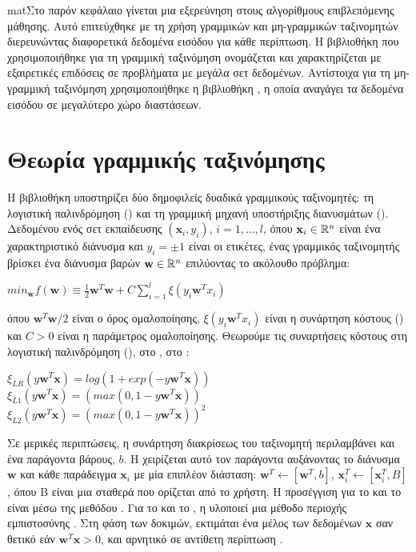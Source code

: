 matΣτο παρόν κεφάλαιο γίνεται μια εξερεύνηση στους αλγορίθμους επιβλεπόμενης μάθησης. Αυτό επιτεύχθηκε με τη χρήση γραμμικών και μη-γραμμικών ταξινομητών διερευνώντας διαφορετικά δεδομένα εισόδου για κάθε περίπτωση. Η βιβλιοθήκη που χρησιμοποιήθηκε για τη γραμμική ταξινόμηση ονομάζεται  και χαρακτηρίζεται με εξαιρετικές επιδόσεις σε προβλήματα με μεγάλα σετ δεδομένων. Αντίστοιχα για τη μη-γραμμική ταξινόμηση χρησιμοποιήθηκε η βιβλιοθήκη , η οποία αναγάγει τα δεδομένα εισόδου σε μεγαλύτερο χώρο διαστάσεων.
\section{Θεωρία γραμμικής ταξινόμησης}
Η βιβλιοθήκη  υποστηρίζει δύο δημοφιλείς δυαδικά γραμμικούς ταξινομητές: τη λογιστική παλινδρόμηση () και τη γραμμική μηχανή υποστήριξης διανυσμάτων (). Δεδομένου ενός σετ εκπαίδευσης $(\mathbf{x}_i, y_i)$, $i=1,...,l$, όπου $\mathbf{x}_i\in\mathbb{R}^n$ είναι ένα χαρακτηριστικό διάνυσμα και $y_i=\pm1$ είναι οι ετικέτες, ένας γραμμικός ταξινομητής βρίσκει ένα διάνυσμα βαρών $\mathbf{w}\in\mathbb{R}^n$ επιλύοντας το ακόλουθο πρόβλημα:
\begin{center}
$min_{\mathbf{w}}f(\mathbf{w})\equiv\frac{1}{2}\mathbf{w}^T\mathbf{w}+C\sum_{i=1}^{l}\xi(y_i\mathbf{w}^T x_i)$
\end{center}
όπου $\mathbf{w}^T\mathbf{w}/2$ είναι ο όρος ομαλοποίησης, $\xi(y_i\mathbf{w}^T x_i)$ είναι η συνάρτηση κόστους () και $C>0$ είναι η παράμετρος ομαλοποίησης. Θεωρούμε τις συναρτήσεις κόστους στη λογιστική παλινδρόμηση (), στο  , στο :
\begin{center}
$\xi_{LR}(y\mathbf{w}^T\mathbf{x})=log(1 + exp(-y\mathbf{w}^T\mathbf{x}))$\\
$\xi_{L1}(y\mathbf{w}^T\mathbf{x})=(max(0, 1 - y\mathbf{w}^T\mathbf{x}))$\\
$\xi_{L2}(y\mathbf{w}^T\mathbf{x})=(max(0, 1 - y\mathbf{w}^T\mathbf{x}))^2$
\end{center}
Σε μερικές περιπτώσεις, η συνάρτηση διακρίσεως του ταξινομητή περιλαμβάνει και ένα παράγοντα βάρους, $b$. Η  χειρίζεται αυτό τον παράγοντα αυξάνοντας το διάνυσμα $\mathbf{w}$ και κάθε παράδειγμα $\mathbf{x}_i$ με μία επιπλέον διάσταση: $\mathbf{w}^T \leftarrow [\mathbf{w}^T, b]$, $\mathbf{x}_i^T \leftarrow [\mathbf{x}_i^T, B]$, όπου B είναι μια σταθερά που ορίζεται από το χρήστη. Η προσέγγιση για το  και το   είναι μέσω της μεθόδου . Για το  και το , η  υλοποιεί μια μέθοδο περιοχής εμπιστοσύνης . Στη φάση των δοκιμών, εκτιμάται ένα μέλος των δεδομένων $\mathbf{x}$ σαν θετικό εάν $\mathbf{w}^T\mathbf{x}>0$, και αρνητικό σε αντίθετη περίπτωση\cite{liblinearguide} \cite{liblinearreport}.\par
